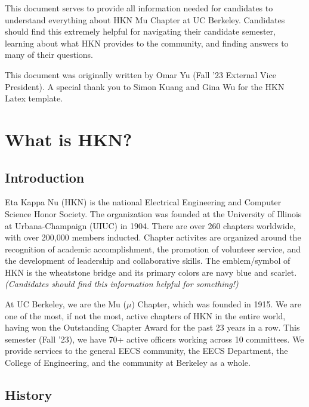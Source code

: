 \documentclass[11pt, article, oneside]{memoir}
\begin{document}
	\maketitle
	
	This document serves to provide all information needed for candidates to understand everything about HKN Mu Chapter at UC Berkeley. Candidates should find this extremely helpful for navigating their candidate semester, learning about what HKN provides to the community, and finding answers to many of their questions.
    \bigbreak

    This document was originally written by Omar Yu (Fall '23 External Vice President). A special thank you to Simon Kuang and Gina Wu for the HKN Latex template.
	
	\tableofcontents*
	\newpage

    
	\chapter{What is HKN?}
    \section{Introduction}
        Eta Kappa Nu (HKN) is the national Electrical Engineering and Computer Science Honor Society. The organization was founded at the University of Illinois at Urbana-Champaign (UIUC) in 1904. There are over 260 chapters worldwide, with over 200,000 members inducted. Chapter activites are organized around the recognition of academic accomplishment, the promotion of volunteer service, and the development of leadership and collaborative skills. The emblem/symbol of HKN is the wheatstone bridge and its primary colors are navy blue and scarlet. \emph{(Candidates should find this information helpful for something!)}
        
        \bigbreak
        At UC Berkeley, we are the Mu ($\mu$) Chapter, which was founded in 1915. We are one of the most, if not the most, active chapters of HKN in the entire world, having won the Outstanding Chapter Award for the past 23 years in a row. This semester (Fall '23), we have 70+ active officers working across 10 committees. We provide services to the general EECS community, the EECS Department, the College of Engineering, and the  community at Berkeley as a whole.

    \section{History}
        
\end{document}
